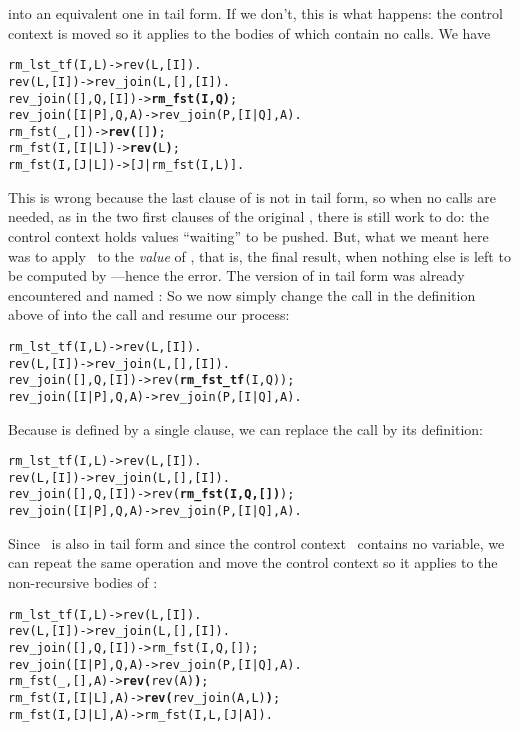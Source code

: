into an equivalent one in tail form. If we don't, this is what
happens: the control context  is moved
so it applies to the bodies of  which contain no
calls. We have
\begin{alltt}
rm_lst_tf(I,L)        -> rev(L,[I]).
rev(L,[I])            -> rev_join(L,[],[I]).
rev_join(   [],Q,[I]) -> \textbf{rm_fst(I,Q)};
rev_join([I|P],Q,  A) -> rev_join(P,[I|Q],A).
rm_fst(_,   [])       -> \textbf{rev(}[]\textbf{)};\hfill% \emph{Wrong}
rm_fst(I,[I|L])       -> \textbf{rev(}L\textbf{)};\hfill% \emph{Wrong}
rm_fst(I,[J|L])       -> [J|rm_fst(I,L)].
\end{alltt}
This is wrong because the last clause of  is not in
tail form, so when no calls are needed, as in the two first clauses of
the original , there is still work to do: the
control context \erlcode{[J|\textvisiblespace]} holds values
``waiting'' to be pushed. But, what we meant here was to
apply~ to the \emph{value} of ,
that is, the final result, when nothing else is left to be computed by
---hence the error. The version of
 in tail form was already encountered
 and named :
 So we now simply change the call
 in the definition above of
 into the call  and
resume our process:
\begin{alltt}
rm_lst_tf(I,L)        -> rev(L,[I]).
rev(L,[I])            -> rev_join(L,[],[I]).
rev_join(   [],Q,[I]) -> rev(\textbf{rm_fst_tf}(I,Q));\hfill% \emph{Renaming}
rev_join([I|P],Q,  A) -> rev_join(P,[I|Q],A).
\end{alltt}
Because  is defined by a single clause, we can
replace the call  by its definition:
\begin{alltt}
rm_lst_tf(I,L)        -> rev(L,[I]).
rev(L,[I])            -> rev_join(L,[],[I]).
rev_join(   [],Q,[I]) -> rev(\textbf{rm_fst(I,Q,[])});
rev_join([I|P],Q,  A) -> rev_join(P,[I|Q],A).
\end{alltt}
Since ~is also in tail form and since the control
context~ contains no variable, we can
repeat the same operation and move the control context so it applies
to the non\hyp{}recursive bodies of :
\begin{alltt}
rm_lst_tf(I,L)        -> rev(L,[I]).
rev(L,[I])            -> rev_join(L,[],[I]).
rev_join(   [],Q,[I]) -> rm_fst(I,Q,[]);
rev_join([I|P],Q,  A) -> rev_join(P,[I|Q],A).
rm_fst(_,   [],A)     -> \textbf{rev(}rev(A)\textbf{)};\hfill% \emph{Added context}
rm_fst(I,[I|L],A)     -> \textbf{rev(}rev_join(A,L)\textbf{)};\hfill% \emph{Added context}
rm_fst(I,[J|L],A)     -> rm_fst(I,L,[J|A]).
\end{alltt}
